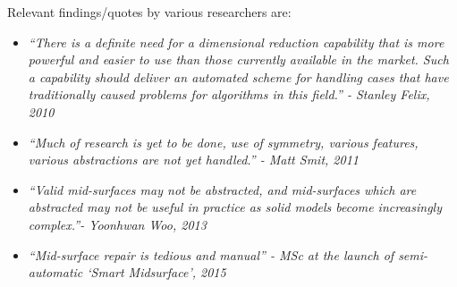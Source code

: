 Relevant findings/quotes by various researchers are:
	\begin{itemize}[noitemsep,topsep=2pt,parsep=2pt,partopsep=2pt]
	\item {\em``There is a definite need for a dimensional reduction capability that is more powerful and easier to use than those currently available in the market. Such a capability should deliver an automated scheme for handling cases that have traditionally caused problems for algorithms in this field.'' - Stanley Felix, 2010 } \cite{Stanley2010}
	\item {\em ``Much of research is yet to be done, use of symmetry, various features, various abstractions are not yet handled.'' - Matt Smit, 2011 } \cite{Smit2011}
	\item {\em  ``Valid mid-surfaces may not be abstracted, and mid-surfaces which are abstracted may not be useful in practice as solid models become increasingly complex.''- Yoonhwan Woo, 2013 \cite{Woo2013}}
	\item {\em  ``Mid-surface repair is tedious and manual'' - MSc at the launch of  semi-automatic `Smart Midsurface', 2015 \cite{Msc2015}}
	\end{itemize}
	

